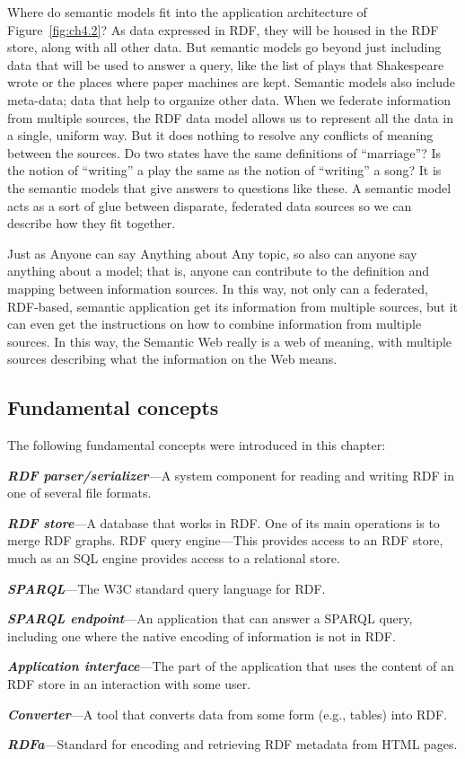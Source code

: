Where do semantic models fit into the application architecture of Figure~\ref{fig:ch4.2}? 
As data expressed in
RDF, they will be housed in the RDF store, along with all other data.
But semantic models go beyond just including data that will be used to
answer a query, like the list of plays that Shakespeare wrote or the
places where paper machines are kept. Semantic models also include
meta-data; data that help to organize other data. When we federate
information from multiple sources, the RDF data model allows us to
represent all the data in a single, uniform way. But it does nothing to
resolve any conflicts of meaning between the sources. Do two states have
the same definitions of ``marriage''? Is the notion of ``writing'' a
play the same as the notion of ``writing'' a song? It is the semantic
models that give answers to questions like these. A semantic model acts
as a sort of glue between disparate, federated data sources so we can
describe how they fit together.

Just as Anyone can say Anything about Any topic, so also can anyone say
anything about a model; that is, anyone can contribute to the definition
and mapping between information sources. In this way, not only can a
federated, RDF-based, semantic application get its information from
multiple sources, but it can even get the instructions on how to combine
information from multiple sources. In this way, the Semantic Web really
is a web of meaning, with multiple sources describing what the
information on the Web means.

\subsection{Fundamental concepts}

The following fundamental concepts were introduced in this chapter:

\emph{\textbf{RDF parser/serializer}}---A system component for reading and writing RDF
in one of several file formats.

\emph{\textbf{RDF store}}---A database that works in RDF. One of its main operations is
to merge RDF graphs. RDF query engine---This provides access to an RDF
store, much as an SQL engine provides access to a relational store.

\emph{\textbf{SPARQL}}---The W3C standard query language for RDF.

\emph{\textbf{SPARQL endpoint}}---An application that can answer a SPARQL query,
including one where the native encoding of information is not in RDF.

\emph{\textbf{Application interface}}---The part of the application that uses the
content of an RDF store in an interaction with some user.

\emph{\textbf{Converter}}---A tool that converts data from some form (e.g., tables) into
RDF.

\emph{\textbf{RDFa}}---Standard for encoding and retrieving RDF metadata from HTML
pages.

